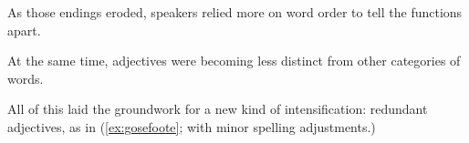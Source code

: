 As those endings eroded, speakers relied more on word order to tell the functions apart.  

At the same time, adjectives were becoming less distinct from other categories of words.





All of this laid the groundwork for a new kind of intensification: redundant adjectives, as in (\ref{ex:gosefoote}; with minor spelling adjustments.)

\label{ex:gosefoote}
\z

